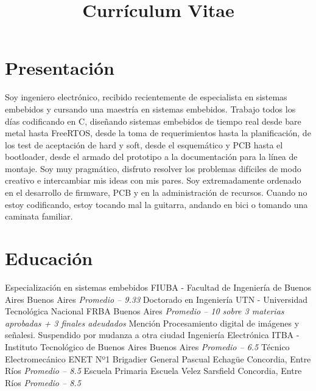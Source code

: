 \documentclass[11pt,a4paper,sans]{moderncv}  %
\title               { Currículum Vitae                                                    }
\begin{document}
\makecvtitle %
\section{Presentación}
Soy ingeniero electrónico, recibido recientemente de especialista en sistemas
embebidos y cursando una maestría en sistemas embebidos. Trabajo todos los días
codificando en C, diseñando sistemas embebidos de tiempo real desde bare metal
hasta FreeRTOS, desde la toma de requerimientos hasta la planificación, de los
test de aceptación de hard y soft, desde el esquemático y PCB hasta el
bootloader, desde el armado del prototipo a la documentación para la línea de
montaje.  Soy muy pragmático, disfruto resolver los problemas difíciles de modo
creativo e intercambiar mis ideas con mis pares. Soy extremadamente ordenado en
el desarrollo de firmware, PCB y en la administración de recursos.  Cuando no
estoy codificando, estoy tocando mal la guitarra, andando en bici o tomando una
caminata familiar.

\section{Educación}
 { Especialización en sistemas embebidos} { FIUBA - Facultad de Ingeniería de Buenos Aires} { Buenos Aires}          { \textit { Promedio -- 9.33}}                                            { }
 { Doctorado en Ingeniería}               { UTN - Universidad Tecnológica Nacional FRBA}    { Buenos Aires}          { \textit { Promedio -- 10 sobre 3 materias aprobadas + 3 finales adeudados}} { Mención Procesamiento digital de imágenes y señalesi. Suspendido por mudanza a otra ciudad}
 { Ingeniería Electrónica}                { ITBA - Instituto Tecnológico de Buenos Aires}   { Buenos Aires}          { \textit { Promedio -- 6.5}}                                                 { }
 { Técnico Electromecánico}               { ENET Nº1 Brigadier General Pascual Echagüe}     { Concordia, Entre Ríos} { \textit { Promedio -- 8.5}}                                                 { }
 { Escuela Primaria}                      { Escuela Velez Sarsfield}                        { Concordia, Entre Ríos} { \textit { Promedio -- 8.5}}                                                 { }
\end{document}
